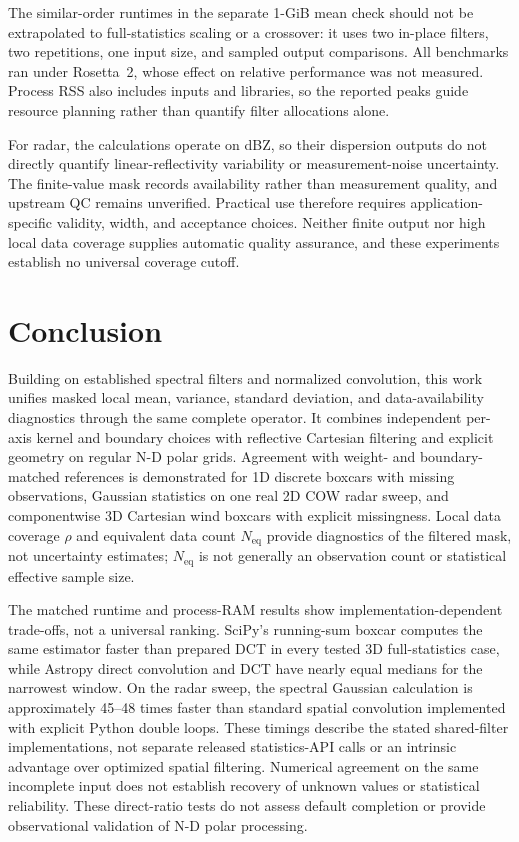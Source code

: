 \documentclass[a4paper,fleqn]{cas-sc}
\begin{document}
The similar-order runtimes in the separate 1-GiB mean check should not be extrapolated to full-statistics scaling or a crossover: it uses two in-place filters, two repetitions, one input size, and sampled output comparisons. All benchmarks ran under Rosetta~2, whose effect on relative performance was not measured. Process RSS also includes inputs and libraries, so the reported peaks guide resource planning rather than quantify filter allocations alone.

For radar, the calculations operate on dBZ, so their dispersion outputs do not directly quantify linear-reflectivity variability or measurement-noise uncertainty. The finite-value mask records availability rather than measurement quality, and upstream QC remains unverified. Practical use therefore requires application-specific validity, width, and acceptance choices. Neither finite output nor high local data coverage supplies automatic quality assurance, and these experiments establish no universal coverage cutoff.

\section{Conclusion}
\label{sec:conclusion}

Building on established spectral filters and normalized convolution, this work unifies masked local mean, variance, standard deviation, and data-availability diagnostics through the same complete operator. It combines independent per-axis kernel and boundary choices with reflective Cartesian filtering and explicit geometry on regular N-D polar grids. Agreement with weight- and boundary-matched references is demonstrated for 1D discrete boxcars with missing observations, Gaussian statistics on one real 2D COW radar sweep, and componentwise 3D Cartesian wind boxcars with explicit missingness. Local data coverage $\rho$ and equivalent data count $N_{\mathrm{eq}}$ provide diagnostics of the filtered mask, not uncertainty estimates; $N_{\mathrm{eq}}$ is not generally an observation count or statistical effective sample size.

The matched runtime and process-RAM results show implementation-dependent trade-offs, not a universal ranking. SciPy's running-sum boxcar computes the same estimator faster than prepared DCT in every tested 3D full-statistics case, while Astropy direct convolution and DCT have nearly equal medians for the narrowest window. On the radar sweep, the spectral Gaussian calculation is approximately 45--48 times faster than standard spatial convolution implemented with explicit Python double loops. These timings describe the stated shared-filter implementations, not separate released statistics-API calls or an intrinsic advantage over optimized spatial filtering. Numerical agreement on the same incomplete input does not establish recovery of unknown values or statistical reliability. These direct-ratio tests do not assess default completion or provide observational validation of N-D polar processing.
\end{document}
